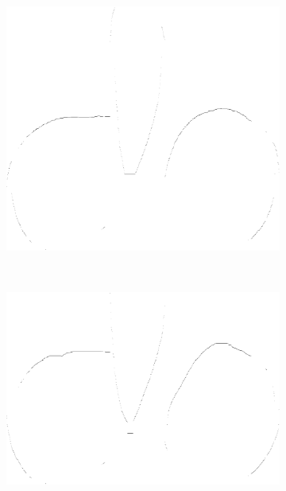 \begin{figure}
\begin{subfigure}[b]{0.25\textwidth}
\caption{}\label{fig:pasos_mala_seg_rlsa}
\end{subfigure}
~
\begin{subfigure}[b]{0.25\textwidth}
\centering
\includegraphics[width=\textwidth]{images/do_upcont.eps}
\caption{}\label{fig:pasos_mala_seg_sup}
\end{subfigure}\\
\begin{subfigure}[b]{0.25\textwidth}
\centering
\includegraphics[width=\textwidth]{images/do_lowcont.eps}
\caption{}\label{fig:pasos_mala_seg_inf}
\end{subfigure}
~

\end{figure}
